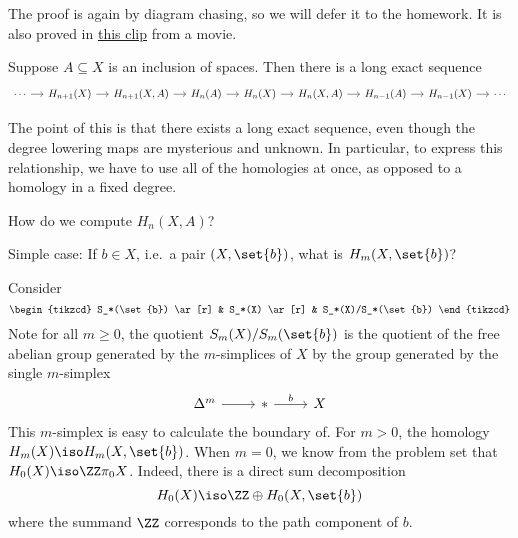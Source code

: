 \documentclass{standalone}
\begin{document}
The proof is again by diagram chasing, so we will defer it to the homework.
It is also proved in
\href{https://www.youtube.com/watch?v=etbcKWEKnvg}{this clip} from a movie.

\begin{corollary}
  Suppose \(A \subseteq X\) is an inclusion of spaces.
  Then there is a long exact sequence
  \[
    \begin{tikzcd}[column sep=small]
    	\cdots \ar[r] &
    	H_{n+1}(X) \ar[r] &
    	H_{n+1}(X, A) \ar[r] &
    	H_n(A) \ar[r] &
    	H_n(X) \ar[r] &
    	H_n(X, A) \ar[r] &
    	H_{n-1}(A) \ar[r] &
    	H_{n-1}(X) \ar[r] &
    	\cdots
    \end{tikzcd}
  \]
\end{corollary}
The point of this is that there exists a long exact sequence, even though
the degree lowering maps are mysterious and unknown. In particular,
to express this relationship, we have to use all of the homologies at once, as opposed to a
homology in a fixed degree.

\begin{question}
   How do we compute \(H_n(X, A)\)?
\end{question}

Simple case: If \(b \in X\), i.e.\ a pair \((X, \set{b})\),
what is \(H_m(X, \set{b})\)?

Consider
\[
  \begin{tikzcd}
  	S_*(\set{b}) \ar[r] &
  	S_*(X) \ar[r] &
  	S_*(X)/S_*(\set{b})
  \end{tikzcd}
\]
Note for all \(m \geq 0\), the quotient \(S_m(X) / S_m(\set{b})\) is
the quotient of the free abelian group generated by the \(m\)-simplices
of \(X\) by the group generated by the single \(m\)-simplex
\[
  \begin{tikzcd}
  	\Delta^m \ar[r] &
  	* \ar[r, "b"] &
  	X
  \end{tikzcd}
\]
This \(m\)-simplex is easy to calculate the boundary of.
For \(m > 0\), the homology \(H_m(X) \iso H_m(X, \set{b})\).
When \(m = 0\), we know from the problem set that \(H_0(X) \iso \ZZ \pi_0 X\).
Indeed, there is a direct sum decomposition
\[
  H_0(X) \iso \ZZ \oplus H_0(X, \set{b})
\]
where the summand \(\ZZ\) corresponds to the path component of \(b\).
\end{document}
